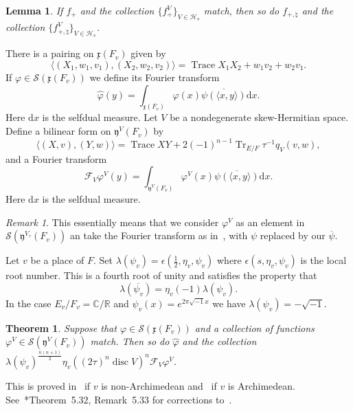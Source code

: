 \documentclass[letterpaper,11pt]{amsart}
\newcommand{\fx}{\mathfrak{x}}
\newcommand{\fy}{\mathfrak{y}}
\newcommand{\C}{\mathbb{C}}
\newcommand{\R}{\mathbb{R}}
\newcommand{\cF}{\mathcal{F}}
\newcommand{\cH}{\mathcal{H}}
\newcommand{\cS}{\mathcal{S}}
\newcommand{\rd}{\mathrm{d}}
\newcommand{\<}{\negthickspace}
\DeclareMathOperator{\Tr}{Tr}
\DeclareMathOperator{\Trace}{Trace}
\DeclareMathOperator{\disc}{disc}
\theoremstyle{definition}
\theoremstyle{plain}
\newtheorem{theorem}[definition]{Theorem}
\newtheorem{lemma}[definition]{Lemma}
\theoremstyle{remark}
\newtheorem{remark}[definition]{Remark}
\numberwithin{equation}{section}
\begin{document}
\begin{lemma}   \label{lemma:Lie_algebra_matching}
If $f_+$ and the collection $\{f_+^V\}_{V \in \cH_v}$ match, then so do
$f_{+, \natural}$ and the collection $\{f^V_{+, \natural}\}_{V \in \cH_v}$.
\end{lemma}




There is a pairing on $\fx(F_v)$ given by
    \begin{equation}    \label{eq:pairing_x_n}
    \langle (X_1, w_1, v_1), (X_2, w_2, v_2) \rangle =
    \Trace X_1X_2 + w_1 v_2 + w_2v_1.
    \end{equation}
If $\varphi \in \cS(\fx(F_v))$ we define its Fourier transform
    \[
    \widehat{\varphi}(y) = \int_{\fx(F_v)} \varphi(x)
    \overline{\psi(\langle x, y \rangle)} \rd x.
    \]
Here $\rd x$ is the selfdual measure.
Let $V$ be a nondegenerate skew-Hermitian space. Define a bilinear form on $\fy^{V}(F_v)$
by
    \[
    \langle (X, v), (Y, w) \rangle =
    \Trace XY + 2 (-1)^{n-1} \Tr_{E/F} \tau^{-1} q_{V}(v, w),
    \]
and a Fourier transform
    \[
    \cF_{V}\varphi^V(y) = \int_{\fy^{V}(F_v)} \varphi^V(x)
    \overline{\psi(\langle x, y \rangle)} \rd x.
    \]
Here $\rd x$ is the selfdual measure.

\begin{remark}
This essentially means that we consider $\varphi^V$ as an element in
$\cS(\fy^{V_\tau}(F_v))$ an take the Fourier transform as
in~\cites{BP1,CZ,Zhang1}, with $\psi$ replaced by our $\overline{\psi}$.
\end{remark}

Let $v$ be a place of $F$. Set $\lambda(\psi_v) =\epsilon(\frac{1}{2},
\eta_v, \psi_v)$ where $\epsilon(s, \eta_v, \psi_v)$ is the local root
number. This is a fourth root of unity and satisfies the property that
    \[
    \lambda(\overline{\psi_v}) = \eta_v(-1) \lambda(\psi_v).
    \]
In the case $E_v/F_v = \C/\R$ and $\psi_v(x) = e^{2\pi\sqrt{-1} x}$ we have
$\lambda(\psi_v) = -\sqrt{-1}$.

\begin{theorem} \label{thm:Fourier_matching}
Suppose that $\varphi \in \cS(\fx(F_v))$ and a collection of functions
$\varphi^V \in \cS(\fy^V(F_v))$ match. Then so do $\widehat{\varphi}$ and
the collection $\lambda(\psi_v)^{\frac{n(n+1)}{2}} \eta_v((2\tau)^n \disc
V)^n \cF_{V}\varphi^V$.
\end{theorem}

This is proved in~\cite{Zhang1} if $v$ is non-Archimedean and~\cite{Xue3} if
$v$ is Archimedean. See~\cite{BP1}*{Theorem~5.32, Remark~5.33} for
corrections to~\cite{Zhang1}.
\end{document}
